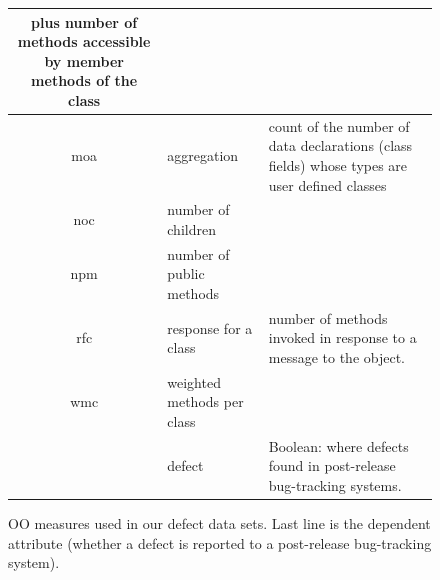 \documentclass[12pt]{IEEEtran}
\begin{document}
\begin{figure}[htbp!]
\begin{center}
{\begin{tabular}{c|l|p{4.7in}}
				plus number of methods accessible by member methods of the
				class\\\hline
				moa &  aggregation &  count of the number of data declarations (class
				fields) whose types are user defined classes\\\hline
				noc &  number of children &\\\hline
				npm & number of public methods & \\\hline
				rfc & response for a class &number of  methods invoked in response to
				a message to the object.\\\hline
				wmc & weighted methods per class &\\\hline
				\rowcolor[HTML]{EFEFEF}
				\multicolumn{1}{l}{defect} & defect & Boolean: where defects found in post-release bug-tracking systems.
			\end{tabular}
		}
	\end{center}
	\caption{OO measures used in our defect data sets.  Last line is
		the dependent attribute (whether a defect is reported to  a
		post-release bug-tracking system).}\label{fig:ck}
\end{figure}
\end{document}
